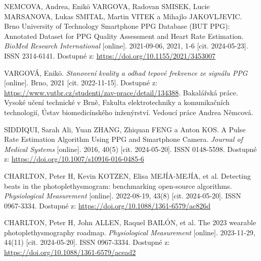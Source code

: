 

\begin{thebibliography}{99}

		NEMCOVA, Andrea, Enikö VARGOVA, Radovan SMISEK, Lucie MARSANOVA, Lukas SMITAL, Martin VITEK a Mihajlo JAKOVLJEVIC.
		Brno University of Technology Smartphone PPG Database (BUT PPG): Annotated Dataset for PPG Quality Assessment and Heart Rate Estimation.
		\emph{BioMed Research International} [online].
		2021-09-06, 2021, 1-6 [cit. 2024-05-23].
		ISSN 2314-6141.
		Dostupné z: \url{https://doi.org/10.1155/2021/3453007}
	
		VARGOVÁ, Enikö.
		\emph{Stanovení kvality a odhad tepové frekvence ze signálu PPG} [online].
		Brno, 2021 [cit. 2022-11-15].
		Dostupné z: \url{https://www.vutbr.cz/studenti/zav-prace/detail/134388}.
		Bakalářská práce. Vysoké učení technické v Brně, Fakulta elektrotechniky a komunikačních technologií, Ústav biomedicínského inženýrství.
		Vedoucí práce Andrea Němcová.

		SIDDIQUI, Sarah Ali, Yuan ZHANG, Zhiquan FENG a Anton KOS.
		A Pulse Rate Estimation Algorithm Using PPG and Smartphone Camera.
		\emph{Journal of Medical Systems} [online].
		2016, 40(5) [cit. 2024-05-20].
		ISSN 0148-5598.
		Dostupné z: \url{https://doi.org/10.1007/s10916-016-0485-6}

		CHARLTON, Peter H, Kevin KOTZEN, Elisa MEJÍA-MEJÍA, et al.
		Detecting beats in the photoplethysmogram: benchmarking open-source algorithms.
		\emph{Physiological Measurement} [online].
		2022-08-19, 43(8) [cit. 2024-05-20].
		ISSN 0967-3334.
		Dostupné z: \url{https://doi.org/10.1088/1361-6579/ac826d}

		CHARLTON, Peter H, John ALLEN, Raquel BAILÓN, et al.
		The 2023 wearable photoplethysmography roadmap.
		\emph{Physiological Measurement} [online].
		2023-11-29, 44(11) [cit. 2024-05-20].
		ISSN 0967-3334.
		Dostupné z: \url{https://doi.org/10.1088/1361-6579/acead2}


\end{thebibliography}
